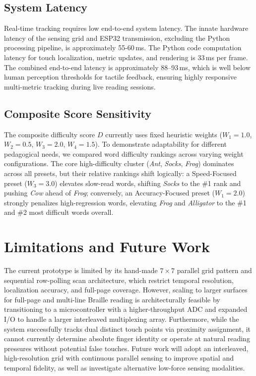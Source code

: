 \documentclass[conference]{IEEEtran}
\begin{document}
    \subsection{System Latency}
    
    Real-time tracking requires low end-to-end system latency. The innate hardware latency of the sensing grid and ESP32 transmission, excluding the Python processing pipeline, is approximately 55-60\,ms. The Python code computation latency for touch localization, metric updates, and rendering is 33\,ms per frame. The combined end-to-end latency is approximately 88--93\,ms, which is well below human perception thresholds for tactile feedback, ensuring highly responsive multi-metric tracking during live reading sessions.

\subsection{Composite Score Sensitivity}

    The composite difficulty score $D$ currently uses fixed heuristic weights ($W_1{=}1.0$, $W_2{=}0.5$, $W_3{=}2.0$, $W_4{=}1.5$). To demonstrate adaptability for different pedagogical needs, we compared word difficulty rankings across varying weight configurations. The core high-difficulty cluster (\textit{Ant}, \textit{Socks}, \textit{Frog}) dominates across all presets, but their relative rankings shift logically: a Speed-Focused preset ($W_3{=}3.0$) elevates slow-read words, shifting \textit{Socks} to the \#1 rank and pushing \textit{Cow} ahead of \textit{Frog}; conversely, an Accuracy-Focused preset ($W_1{=}2.0$) strongly penalizes high-regression words, elevating \textit{Frog} and \textit{Alligator} to the \#1 and \#2 most difficult words overall.

    \section{Limitations and Future Work}
    \label{sec:limitations}

    

    The current prototype is limited by its hand-made $7\times7$ parallel grid pattern and sequential row-polling scan architecture, which restrict temporal resolution, localization accuracy, and full-page coverage. However, scaling to larger surfaces for full-page and multi-line Braille reading is architecturally feasible by transitioning to a microcontroller with a higher-throughput ADC and expanded I/O to handle a larger interleaved multiplexing array.
    Furthermore, while the system successfully tracks dual
    distinct touch points via proximity assignment, it cannot currently determine
    absolute finger identity or operate at natural reading pressures without
    potential false touches. Future work will adopt an interleaved, high-resolution
    grid with continuous parallel sensing to improve spatial and temporal fidelity,
    as well as investigate alternative low-force sensing modalities.
\end{document}
